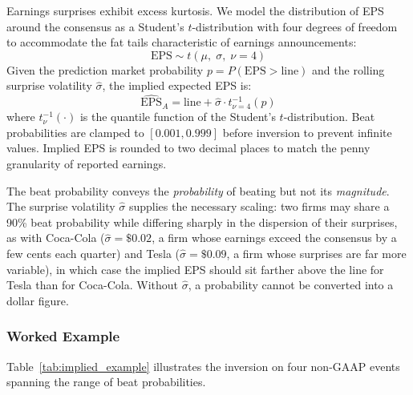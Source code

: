 \documentclass[11pt]{article}
\begin{document}
Earnings surprises exhibit excess kurtosis. We model the distribution of EPS around the consensus as a Student's $t$-distribution with four degrees of freedom to accommodate the fat tails characteristic of earnings announcements:
\begin{equation}
\text{EPS} \sim t\!\left(\mu,\; \sigma,\; \nu = 4\right)
\end{equation}
Given the prediction market probability $p = P(\text{EPS} > \text{line})$ and the rolling surprise volatility $\hat{\sigma}$, the implied expected EPS is:
\begin{equation}
\widehat{\text{EPS}}_A = \text{line} + \hat{\sigma} \cdot t^{-1}_{\nu=4}(p)
\end{equation}
where $t^{-1}_{\nu}(\cdot)$ is the quantile function of the Student's $t$-distribution. Beat probabilities are clamped to $[0.001, 0.999]$ before inversion to prevent infinite values. Implied EPS is rounded to two decimal places to match the penny granularity of reported earnings.

The beat probability conveys the \textit{probability} of beating but not its \textit{magnitude}. The surprise volatility $\hat{\sigma}$ supplies the necessary scaling: two firms may share a 90\% beat probability while differing sharply in the dispersion of their surprises, as with Coca-Cola ($\hat{\sigma} = \$0.02$, a firm whose earnings exceed the consensus by a few cents each quarter) and Tesla ($\hat{\sigma} = \$0.09$, a firm whose surprises are far more variable), in which case the implied EPS should sit farther above the line for Tesla than for Coca-Cola. Without $\hat{\sigma}$, a probability cannot be converted into a dollar figure.

\subsubsection{Worked Example}

Table~\ref{tab:implied_example} illustrates the inversion on four non-GAAP events spanning the range of beat probabilities.
\end{document}
